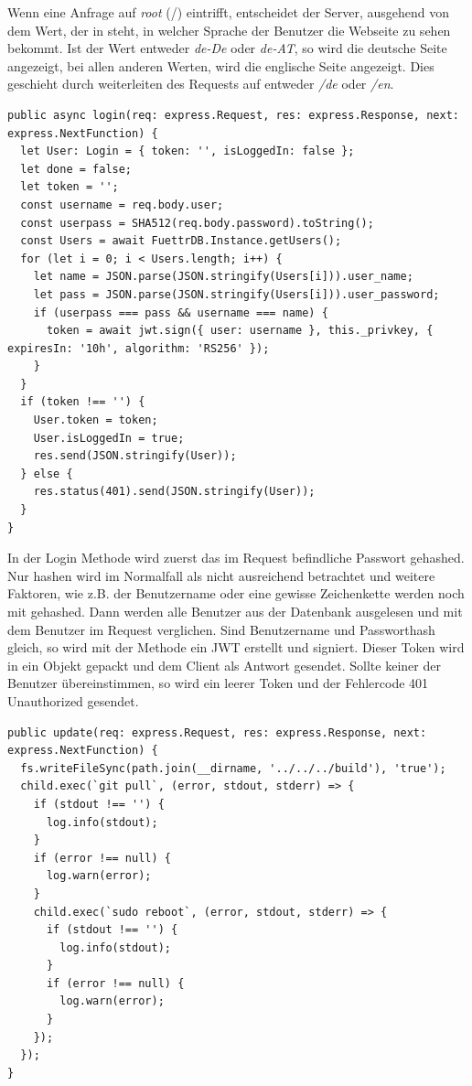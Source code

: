 Wenn eine Anfrage auf \textit{root} (/) eintrifft, entscheidet der Server, ausgehend von dem Wert, der in  steht, in welcher Sprache der Benutzer die Webseite zu sehen bekommt. Ist der Wert entweder \textit{de-De} oder \textit{de-AT}, so wird die deutsche Seite angezeigt, bei allen anderen Werten, wird die englische Seite angezeigt. Dies geschieht durch weiterleiten des Requests auf entweder \textit{/de} oder \textit{/en}. 

\begin{lstlisting}[style=TS,caption=Login Methode,label=login]
public async login(req: express.Request, res: express.Response, next: express.NextFunction) {
  let User: Login = { token: '', isLoggedIn: false };
  let done = false;
  let token = '';
  const username = req.body.user;
  const userpass = SHA512(req.body.password).toString();
  const Users = await FuettrDB.Instance.getUsers();
  for (let i = 0; i < Users.length; i++) {
    let name = JSON.parse(JSON.stringify(Users[i])).user_name;
    let pass = JSON.parse(JSON.stringify(Users[i])).user_password;
    if (userpass === pass && username === name) {
      token = await jwt.sign({ user: username }, this._privkey, { expiresIn: '10h', algorithm: 'RS256' });
    }
  }
  if (token !== '') {
    User.token = token;
    User.isLoggedIn = true;
    res.send(JSON.stringify(User));
  } else {
    res.status(401).send(JSON.stringify(User));
  }
}
\end{lstlisting}

In der Login Methode wird zuerst das im Request befindliche Passwort gehashed. Nur hashen wird im Normalfall als nicht ausreichend betrachtet und weitere Faktoren, wie z.B. der Benutzername oder eine gewisse Zeichenkette werden noch mit gehashed. Dann werden alle Benutzer aus der Datenbank ausgelesen und mit dem Benutzer im Request verglichen. Sind Benutzername und Passworthash gleich, so wird mit der Methode  ein \ac{JWT} erstellt und signiert. Dieser Token wird in ein Objekt gepackt und dem Client als Antwort gesendet. Sollte keiner der Benutzer übereinstimmen, so wird ein leerer Token und der Fehlercode 401 Unauthorized gesendet.

\begin{lstlisting}[caption=Update Methode,label=update methode,style=TS]
public update(req: express.Request, res: express.Response, next: express.NextFunction) {
  fs.writeFileSync(path.join(__dirname, '../../../build'), 'true');
  child.exec(`git pull`, (error, stdout, stderr) => {
    if (stdout !== '') {
      log.info(stdout);
    }
    if (error !== null) {
      log.warn(error);
    }
    child.exec(`sudo reboot`, (error, stdout, stderr) => {
      if (stdout !== '') {
        log.info(stdout);
      }
      if (error !== null) {
        log.warn(error);
      }
    });
  });
}
\end{lstlisting}

